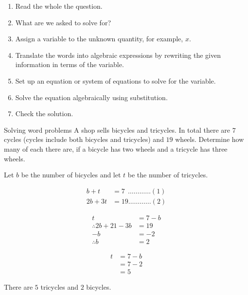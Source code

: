 \begin{enumerate}[noitemsep, label=\textbf{\arabic*}. ] 
\item Read the whole the question.
\item What are we asked to solve for?
\item Assign a variable to the unknown quantity, for example, $x$.
\item  Translate the words into algebraic expressions by rewriting the given information in terms of the variable. 
\item Set up an equation or system of equations to solve for the variable.
\item Solve the equation algebraically using substitution.
\item Check the solution.
\end{enumerate}
\begin{wex}
{Solving word problems}
{A shop sells bicycles and tricycles. In total there are $7$ cycles (cycles include both bicycles and tricycles) and $19$ wheels. Determine how many of each there are, if a bicycle has two wheels and a tricycle has three wheels.}
{
Let $b$ be the number of bicycles and let $t$ be the number of tricycles. 

\begin{align*}
  b + t &= 7 ~~\ldots \ldots \ldots \ldots (1)\\
  2b + 3t &= 19 \ldots \ldots \ldots \ldots (2)
\end{align*}

\begin{align*}
  t &= 7-b \\
  \therefore 2b + 21 - 3b &= 19 \\
  -b &= -2 \\
  \therefore b &= 2
\end{align*}

\begin{align*}
  t &= 7-b \\
    &= 7-2 \\
    &= 5
\end{align*}

There are $5$ tricycles and $2$ bicycles.
}       
\end{wex}

